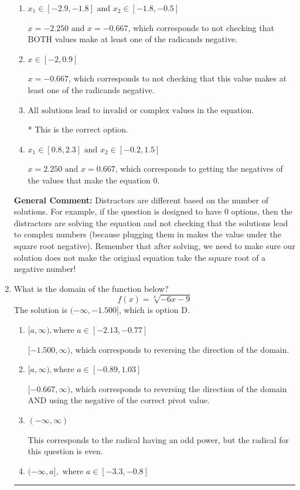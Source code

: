 \documentclass{extbook}[14pt]
\newcommand{\litem}[1]{\item #1

\rule{\textwidth}{0.4pt}}
\begin{document}
\begin{enumerate}
{\begin{enumerate}[label=\Alph*.]
$x = -2.250$, which corresponds to not checking that this value makes at least one of the radicands negative.
\item \( x_1 \in [-2.9, -1.8] \text{ and } x_2 \in [-1.8,-0.5] \)

$x = -2.250 \text{ and } x = -0.667$, which corresponds to not checking that BOTH values make at least one of the radicands negative.
\item \( x \in [-2,0.9] \)

$x = -0.667$, which corresponds to not checking that this value makes at least one of the radicands negative.
\item \( \text{All solutions lead to invalid or complex values in the equation.} \)

* This is the correct option.
\item \( x_1 \in [0.8, 2.3] \text{ and } x_2 \in [-0.2,1.5] \)

$x = 2.250 \text{ and } x = 0.667$, which corresponds to getting the negatives of the values that make the equation 0.
\end{enumerate}

\textbf{General Comment:} Distractors are different based on the number of solutions. For example, if the question is designed to have 0 options, then the distractors are solving the equation and not checking that the solutions lead to complex numbers (because plugging them in makes the value under the square root negative). Remember that after solving, we need to make sure our solution does not make the original equation take the square root of a negative number!
}
\litem{
What is the domain of the function below?
\[ f(x) = \sqrt[6]{-6 x - 9} \]The solution is \( (-\infty, -1.500] \), which is option D.\begin{enumerate}[label=\Alph*.]
\item \( [a, \infty), \text{where } a \in [-2.13, -0.77] \)

 $[-1.500, \infty)$, which corresponds to reversing the direction of the domain.
\item \( [a, \infty), \text{where } a \in [-0.89, 1.03] \)

$[-0.667, \infty)$, which corresponds to reversing the direction of the domain AND using the negative of the correct pivot value.
\item \( (-\infty, \infty) \)

This corresponds to the radical having an odd power, but the radical for this question is even.
\item \( (-\infty, a], \text{ where } a \in [-3.3, -0.8] \)


\end{enumerate}}
\end{enumerate}
\end{document}
